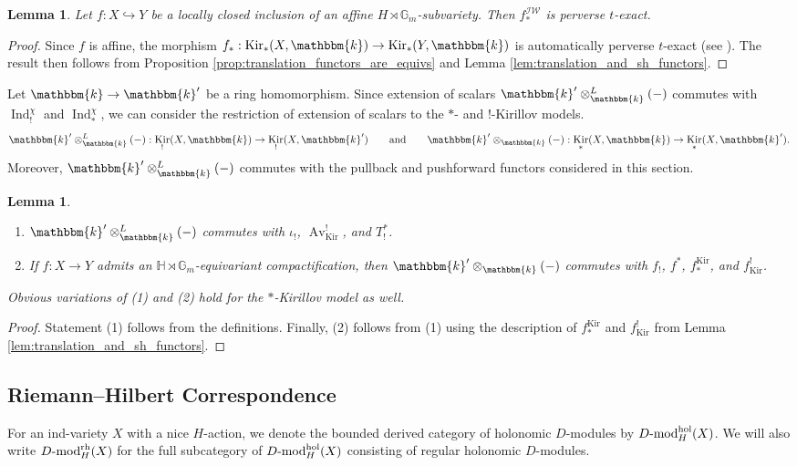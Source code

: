 \documentclass{amsart}
\newcommand{\G}{\mathbb{G}}
\renewcommand{\k}{\mathbbm{k}}
\newcommand{\Dmod}{D\textnormal{-mod}}
\newcommand{\rh}{\textnormal{rh}}
\newcommand{\hol}{\textnormal{hol}}
\newcommand{\IW}{\mathcal{IW}}
\DeclareMathOperator{\Ind}{Ind}
\renewcommand{\H}{\mathbb{H}}
\DeclareMathOperator{\Av}{Av}
\DeclareMathOperator{\Kir}{Kir}
\newtheorem{lemma}[subsubsection]{Lemma}
\theoremstyle{definition}
\begin{document}
    \begin{lemma}\label{lem:costandards_and_perversity}
        Let $f : X \hookrightarrow Y$ be a locally closed inclusion of an affine $H \rtimes \G_m$-subvariety. 
        Then $f_*^{\IW}$ is perverse $t$-exact.
    \end{lemma}
    \begin{proof}
        Since $f$ is affine, the morphism $f_* : \Kir_* (X, \k) \to \Kir_* (Y, \k)$ is automatically perverse $t$-exact (see \cite[Corollaire 4.1.3]{BBD}). The result then follows from Proposition \ref{prop:translation_functors_are_equivs} and Lemma \ref{lem:translation_and_sh_functors}.
    \end{proof}

    Let $\k \to \k'$ be a ring homomorphism. 
    Since extension of scalars $\k' \otimes_{\k}^L (-)$ commutes with $\Ind_!^{\chi}$ and $\Ind_*^{\chi}$, we can consider the restriction of extension of scalars to the $*$- and $!$-Kirillov models.
    \[\k' \otimes_{\k}^L (-) : \Kir_! (X, \k) \to \Kir_! (X, \k') \qquad\text{and}\qquad \k' \otimes_{\k} (-) : \Kir_* (X, \k) \to \Kir_* (X, \k'). \]
    Moreover, $\k' \otimes_{\k}^L (-)$ commutes with the pullback and pushforward functors considered in this section. 

    \begin{lemma}\label{lem:eos_commutes_with_sh_functors}\quad
        \begin{enumerate}
            \item $\k' \otimes_{\k}^L (-)$ commutes with $\iota_!$, $\Av_{\Kir}^!$, and $T_!^*$.
            \item If $f : X \to Y$ admits an $\H \rtimes \G_m$-equivariant compactification, then $\k' \otimes_{\k} (-)$ commutes with $f_!$, $f^*$, $f_*^{\Kir}$, and $f_{\Kir}^!$.
        \end{enumerate}
        Obvious variations of (1) and (2) hold for the $*$-Kirillov model as well.
    \end{lemma}
    \begin{proof}
        Statement (1) follows from the definitions.
        Finally, (2) follows from (1) using the description of $f_*^{\Kir}$ and $f_{\Kir}^!$ from Lemma \ref{lem:translation_and_sh_functors}.
    \end{proof}

    \subsection{Riemann--Hilbert Correspondence}\label{subsec:rh}
    For an ind-variety $X$ with a nice $H$-action, we denote the bounded derived category of holonomic $D$-modules by $\Dmod_H^{\hol} (X)$. We will also write $\Dmod_H^{\rh} (X)$ for the full subcategory of $\Dmod_H^{\hol} (X)$
    consisting of regular holonomic $D$-modules.
\end{document}

